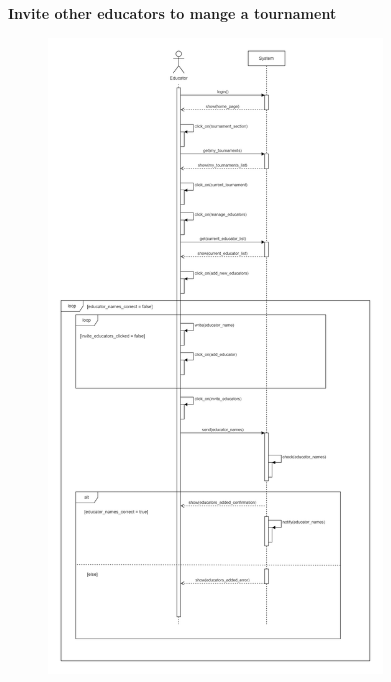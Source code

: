 \documentclass[../RASD.tex]{subfiles}
\begin{document}
    \textbf{Invite other educators to mange a tournament}
    \begin{figure}[h!]
        \centering
        \includegraphics[width=0.79\textwidth]{../assets/section_3/InviteOtherEducatorsToManageATournament.png}
    \end{figure}
    \newpage
    \restoregeometry
\end{document}
